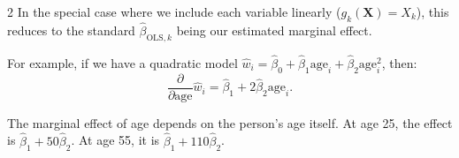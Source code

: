 \documentclass[12pt]{article}
\begin{document}
\begin{multicols}{2}
  In the special case where we include each variable linearly ($g_k(\bm{X}) = X_k$), this reduces to the standard $\hat{\beta}_{\text{OLS}, k}$ being our estimated marginal effect.

  For example, if we have a quadratic model $\hat{w}_i = \hat{\beta}_0 + \hat{\beta}_1 \text{age}_i + \hat{\beta}_2 \text{age}_i^2$, then:
  $$
  \frac{\partial}{\partial \text{age}} \hat{w}_i = \hat{\beta}_1 + 2\hat{\beta}_2 \text{age}_i.
  $$

  The marginal effect of age depends on the person's age itself. At age 25, the effect is $\hat{\beta}_1 + 50\hat{\beta}_2$. At age 55, it is $\hat{\beta}_1 + 110\hat{\beta}_2$.
\end{multicols}
\end{document}
